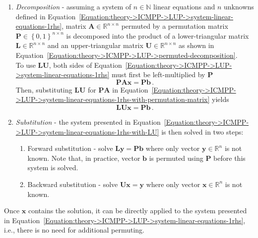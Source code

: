 \begin{enumerate}
	\item \label{Item:theory->ICMPP->LUP->solving-system-linear-equations->decomposition}
		\textit{Decomposition} - assuming a system of $n \in \mathbb{N}$ linear equations and $n$ unknowns defined in Equation~\ref{Equation:theory->ICMPP->LUP->system-linear-equations-1rhs}, matrix $\mathbf{A} \in \mathbb{R}^{n\times n}$ permuted by a permutation matrix $\mathbf{P} \in \left\{0,1\right\}^{n \times n}$ is decomposed into the product of a lower-triangular matrix $\mathbf{L} \in \mathbb{R}^{n\times n}$ and an upper-triangular matrix $\mathbf{U} \in \mathbb{R}^{n\times n}$ as shown in Equation~\ref{Equation:theory->ICMPP->LUP->permuted-decomposition}.\\
		To use $\mathbf{LU}$, both sides of Equation~\ref{Equation:theory->ICMPP->LUP->system-linear-equations-1rhs} must first be left-multiplied by $\mathbf{P}$
		\begin{equation}
			\mathbf{PAx} = \mathbf{Pb} \,.
			\label{Equation:theory->ICMPP->LUP->system-linear-equations-1rhs-with-permutation-matrix}
		\end{equation}
		Then, substituting $\mathbf{LU}$ for $\mathbf{PA}$ in Equation~\ref{Equation:theory->ICMPP->LUP->system-linear-equations-1rhs-with-permutation-matrix} yields
		\begin{equation}
			\mathbf{LUx} = \mathbf{Pb} \,.
			\label{Equation:theory->ICMPP->LUP->system-linear-equations-1rhs-with-LU}
		\end{equation}
	\item \label{Item:theory->ICMPP->LUP->solving-system-linear-equations->substitution}
		\textit{Substitution} - the system presented in Equation~\ref{Equation:theory->ICMPP->LUP->system-linear-equations-1rhs-with-LU} is then solved in two steps:
		\begin{enumerate}
			\item Forward substitution - solve $\mathbf{Ly} = \mathbf{Pb}$ where only vector $\mathbf{y} \in \mathbb{R}^n$ is not known.
				Note that, in practice, vector $\mathbf{b}$ is permuted using $\mathbf{P}$ before this system is solved.
			\item Backward substitution - solve $\mathbf{Ux} = \mathbf{y}$ where only vector $\mathbf{x} \in \mathbb{R}^n$ is not known.
		\end{enumerate}
\end{enumerate}

Once $\mathbf{x}$ contains the solution, it can be directly applied to the system presented in Equation~\ref{Equation:theory->ICMPP->LUP->system-linear-equations-1rhs}, i.e., there is no need for additional permuting.

